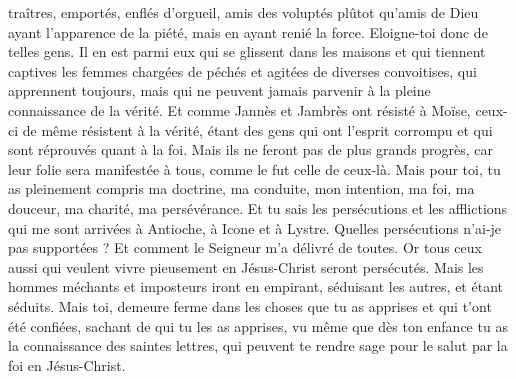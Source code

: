 \begin{multicols}{2}
traîtres, emportés, enflés d'orgueil, amis des voluptés plûtot qu'amis de Dieu
ayant l'apparence de la piété, mais en ayant renié la force. Eloigne-toi donc de telles gens.
Il en est parmi eux qui se glissent dans les maisons et qui tiennent captives les femmes chargées de péchés et agitées de diverses convoitises,
qui apprennent toujours, mais qui ne peuvent jamais parvenir à la pleine connaissance de la vérité.
Et comme Jannès et Jambrès ont résisté à Moïse, ceux-ci de même résistent à la vérité, étant des gens qui ont l'esprit corrompu et qui sont réprouvés quant à la foi.
Mais ils ne feront pas de plus grands progrès, car leur folie sera manifestée à tous, comme le fut celle de ceux-là.
Mais pour toi, tu as pleinement compris ma doctrine, ma conduite, mon intention, ma foi, ma douceur, ma charité, ma persévérance.
Et tu sais les persécutions et les afflictions qui me sont arrivées à Antioche, à Icone et à Lystre. Quelles persécutions n’ai-je pas supportées ? Et comment le Seigneur m'a délivré de toutes.
Or tous ceux aussi qui veulent vivre pieusement en Jésus-Christ seront persécutés.
Mais les hommes méchants et imposteurs iront en empirant, séduisant les autres, et étant séduits.
Mais toi, demeure ferme dans les choses que tu as apprises et qui t'ont été confiées, sachant de qui tu les as apprises,
vu même que dès ton enfance tu as la connaissance des saintes lettres, qui peuvent te rendre sage pour le salut par la foi en Jésus-Christ.

\end{multicols}
